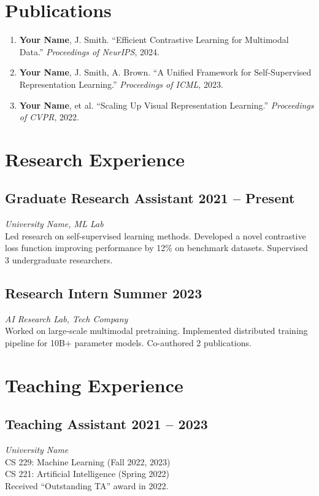 \documentclass[11pt,a4paper]{article}
\begin{document}
\section{Publications}

\begin{enumerate}[leftmargin=*, itemsep=4pt]
  \item \textbf{Your Name}, J. Smith. ``Efficient Contrastive Learning for Multimodal Data.''
    \emph{Proceedings of NeurIPS}, 2024.
  \item \textbf{Your Name}, J. Smith, A. Brown. ``A Unified Framework for Self-Supervised
    Representation Learning.'' \emph{Proceedings of ICML}, 2023.
  \item \textbf{Your Name}, et al. ``Scaling Up Visual Representation Learning.''
    \emph{Proceedings of CVPR}, 2022.
\end{enumerate}

\section{Research Experience}

\subsection{Graduate Research Assistant \hfill 2021 -- Present}
\textit{University Name, ML Lab}\\
Led research on self-supervised learning methods. Developed a novel contrastive loss
function improving performance by 12\% on benchmark datasets. Supervised 3 undergraduate
researchers.

\subsection{Research Intern \hfill Summer 2023}
\textit{AI Research Lab, Tech Company}\\
Worked on large-scale multimodal pretraining. Implemented distributed training pipeline
for 10B+ parameter models. Co-authored 2 publications.

\section{Teaching Experience}

\subsection{Teaching Assistant \hfill 2021 -- 2023}
\textit{University Name}\\
CS 229: Machine Learning (Fall 2022, 2023)\\
CS 221: Artificial Intelligence (Spring 2022)\\
Received ``Outstanding TA'' award in 2022.
\end{document}
